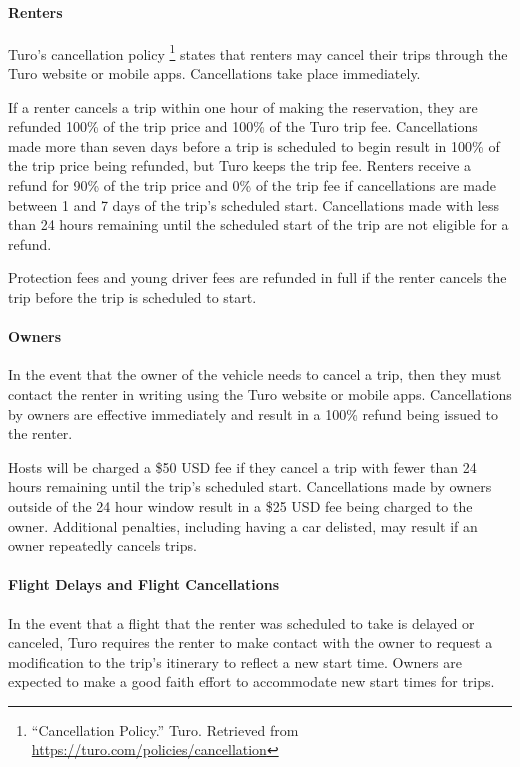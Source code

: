 \documentclass[review,12pt]{elsarticle}
\begin{document}
    \paragraph{Renters}
    Turo's cancellation policy
    \footnote{``Cancellation Policy.'' Turo. Retrieved from \url{https://turo.com/policies/cancellation}
    }
    states that renters may cancel their trips through the Turo website or mobile apps. Cancellations take place immediately.

    If a renter cancels a trip within one hour of making the reservation, they are refunded 100\% of the trip price and 100\% of the Turo trip fee. Cancellations made more than seven days before a trip is scheduled to begin result in 100\% of the trip price being refunded, but Turo keeps the trip fee. Renters receive a refund for 90\% of the trip price and 0\% of the trip fee if cancellations are made between 1 and 7 days of the trip's scheduled start. Cancellations made with less than 24 hours remaining until the scheduled start of the trip are not eligible for a refund.

    Protection fees and young driver fees are refunded in full if the renter cancels the trip before the trip is scheduled to start.

    \paragraph{Owners}
    In the event that the owner of the vehicle needs to cancel a trip, then they must contact the renter in writing using the Turo website or mobile apps. Cancellations by owners are effective immediately and result in a 100\% refund being issued to the renter.

    Hosts will be charged a \$50 USD fee if they cancel a trip with fewer than 24 hours remaining until the trip's scheduled start. Cancellations made by owners outside of the 24 hour window result in a \$25 USD fee being charged to the owner. Additional penalties, including having a car delisted, may result if an owner repeatedly cancels trips.

    \paragraph{Flight Delays and Flight Cancellations}
    In the event that a flight that the renter was scheduled to take is delayed or canceled, Turo requires the renter to make contact with the owner to request a modification to the trip's itinerary to reflect a new start time. Owners are expected to make a good faith effort to accommodate new start times for trips.
\end{document}
